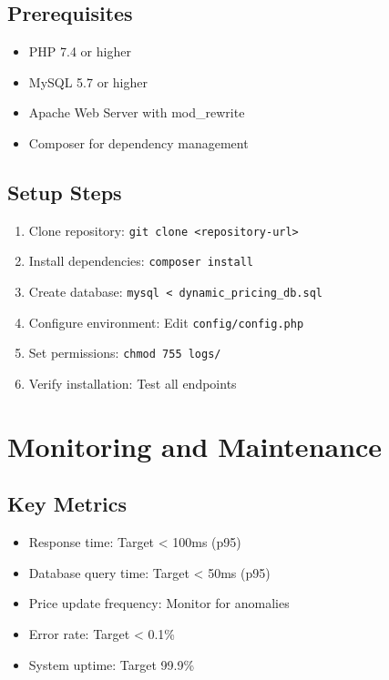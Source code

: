 \documentclass[12pt,a4paper,oneside]{report}
\begin{document}
\subsection{Prerequisites}
\begin{itemize}
    \item PHP 7.4 or higher
    \item MySQL 5.7 or higher
    \item Apache Web Server with mod\_rewrite
    \item Composer for dependency management
\end{itemize}

\subsection{Setup Steps}

\begin{enumerate}
    \item Clone repository: \texttt{git clone <repository-url>}
    \item Install dependencies: \texttt{composer install}
    \item Create database: \texttt{mysql < dynamic\_pricing\_db.sql}
    \item Configure environment: Edit \texttt{config/config.php}
    \item Set permissions: \texttt{chmod 755 logs/}
    \item Verify installation: Test all endpoints
\end{enumerate}

\section{Monitoring and Maintenance}

\subsection{Key Metrics}

\begin{itemize}
    \item Response time: Target < 100ms (p95)
    \item Database query time: Target < 50ms (p95)
    \item Price update frequency: Monitor for anomalies
    \item Error rate: Target < 0.1\%
    \item System uptime: Target 99.9\%
\end{itemize}
\end{document}
